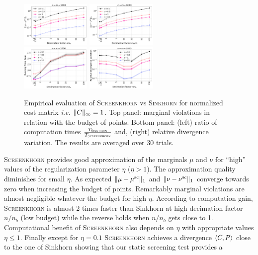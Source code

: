 \begin{figure}[t]
	\begin{center}
		\includegraphics[width=0.3\textwidth]{./figs/norm_M_Mu_marginals_toy_n1000}\hspace{2cm}
		\includegraphics[width=0.3\textwidth]{./figs/norm_M_Nu_marginals_toy_n1000} \\
		\includegraphics[width=0.3\textwidth]{./figs/norm_M_time_toy_n1000}\hspace{2cm}
		\includegraphics[width=0.3\textwidth]{./figs/norm_M_div_toy_n1000}
	\end{center}
	\caption{Empirical evaluation of \textsc{Screenkhorn} vs \textsc{Sinkhorn} for normalized cost matrix \emph{i.e.} $\|C\|_\infty=1$. Top panel: marginal violations in relation with the budget of points. Bottom panel: (left) ratio of computation times    $\frac{T_{\textsc{Sinkhorn}}}{T_{\text{\textsc{Screenkhorn}}}}$ and, (right) relative divergence variation. The results are averaged over $30$ trials.} 
		\label{fig:margin_expe}
\end{figure}
%
\textsc{Screenkhorn} provides good approximation of the marginals $\mu$ and $\nu$ for ``high'' values of the regularization parameter $\eta$ ($\eta > 1$). The approximation quality diminishes for small $\eta$. As expected $\|{\mu} -{\mu}^{\text{sc}}\|_1$ and $\|{\nu} -{\nu}^{\text{sc}}\|_1$ converge towards zero when increasing the budget of points. Remarkably marginal violations are almost negligible whatever the budget for high $\eta$.  According to computation gain, \textsc{Screenkhorn} is almost  2 times faster than Sinkhorn at high decimation factor $n/n_b$ (low budget) while the reverse holds when $n/n_b$ gets close to 1.  Computational benefit of \textsc{Screenkhorn} also depends on $\eta$ with appropriate values $\eta \leq 1$. Finally except for $\eta=0.1$ \textsc{Screenkhorn} achieves a  divergence $\langle C, P \rangle$ close to the one of Sinkhorn showing that our static screening test provides a
